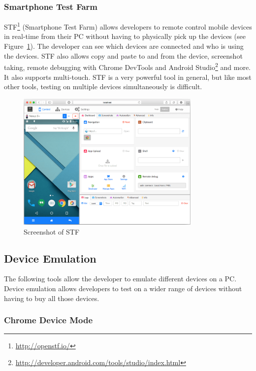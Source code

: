 \subsubsection{Smartphone Test Farm}

STF\footnote{\url{http://openstf.io/}} (Smartphone Test Farm) allows developers to remote control mobile devices in real-time from their PC without having to physically pick up the devices (see Figure~\ref{fig:stf}). The developer can see which devices are connected and who is using the devices. STF also allows copy and paste to and from the device, screenshot taking, remote debugging with Chrome DevTools and Android Studio\footnote{\url{http://developer.android.com/tools/studio/index.html}} and more. It also supports multi-touch. STF is a very powerful tool in general, but like most other tools, testing on multiple devices simultaneously is difficult.

\begin{figure}[H]
  \centering
    \includegraphics[width=0.8\textwidth]{images/relatedwork/stf_2.png}
	\caption[Screenshot: Smartphone Test Farm]{Screenshot of STF}
	\label{fig:stf}
\end{figure}

\subsection{Device Emulation}

The following tools allow the developer to emulate different devices on a PC. Device emulation allows developers to test on a wider range of devices without having to buy all those devices.

\subsubsection{Chrome Device Mode}


